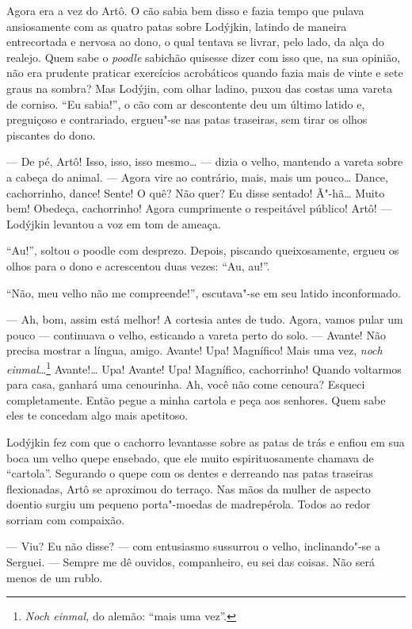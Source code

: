 Agora era a vez do Artô. O cão sabia bem disso e fazia tempo que pulava
ansiosamente com as quatro patas sobre Lodýjkin, latindo de maneira
entrecortada e nervosa ao dono, o qual tentava se livrar, pelo lado, da
alça do realejo. Quem sabe o \emph{poodle} sabichão quisesse dizer com
isso que, na sua opinião, não era prudente praticar exercícios
acrobáticos quando fazia mais de vinte e sete graus na sombra? Mas
Lodýjin, com olhar ladino, puxou das costas uma vareta de corniso. ``Eu
sabia!'', o cão com ar descontente deu um último latido e, preguiçoso e
contrariado, ergueu"-se nas patas traseiras, sem tirar os olhos piscantes
do dono.

--- De pé, Artô! Isso, isso, isso mesmo\ldots{} --- dizia o velho, mantendo a
vareta sobre a cabeça do animal. --- Agora vire ao contrário, mais, mais
um pouco\ldots{} Dance, cachorrinho, dance! Sente! O quê? Não quer? Eu disse
sentado! Ã"-hã\ldots{} Muito bem! Obedeça, cachorrinho! Agora cumprimente o
respeitável público! Artô! --- Lodýjkin levantou a voz em tom de ameaça.

``Au!'', soltou o poodle com desprezo. Depois, piscando queixosamente,
ergueu os olhos para o dono e acrescentou duas vezes: ``Au, au!''.

``Não, meu velho não me compreende!'', escutava"-se em seu latido
inconformado.

--- Ah, bom, assim está melhor! A cortesia antes de tudo. Agora, vamos
pular um pouco --- continuava o velho, esticando a vareta perto do solo.
--- Avante! Não precisa mostrar a língua, amigo. Avante! Upa! Magnífico!
Mais uma vez, \emph{noch einmal}\ldots{}\footnote{\emph{Noch einmal,} do
  alemão: ``mais uma vez''.} Avante!\ldots{} Upa! Avante! Upa! Magnífico,
cachorrinho! Quando voltarmos para casa, ganhará uma cenourinha. Ah,
você não come cenoura? Esqueci completamente. Então pegue a minha
cartola e peça aos senhores. Quem sabe eles te concedam algo mais
apetitoso.

Lodýjkin fez com que o cachorro levantasse sobre as patas de trás e
enfiou em sua boca um velho quepe ensebado, que ele muito
espirituosamente chamava de ``cartola''. Segurando o quepe com os dentes
e derreando nas patas traseiras flexionadas, Artô se aproximou do
terraço. Nas mãos da mulher de aspecto doentio surgiu um pequeno
porta"-moedas de madrepérola. Todos ao redor sorriam com compaixão.

--- Viu? Eu não disse? --- com entusiasmo sussurrou o velho,
inclinando"-se a Serguei. --- Sempre me dê ouvidos, companheiro, eu sei
das coisas. Não será menos de um rublo.

